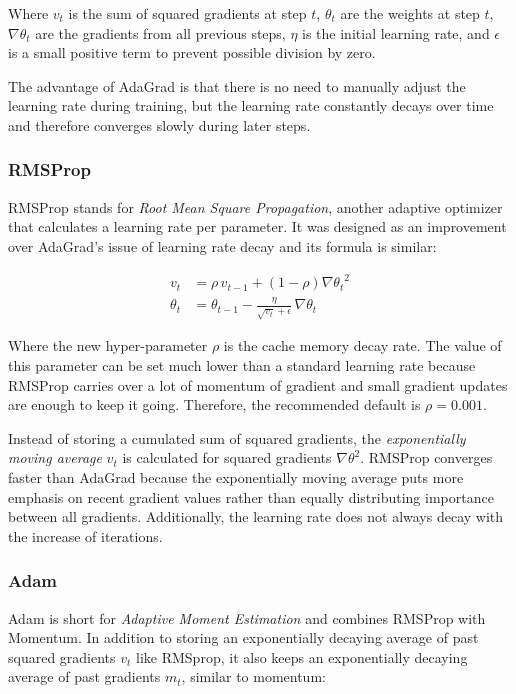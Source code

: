 \documentclass[a4paper]{article}
\begin{document}
Where $v_t$ is the sum of squared gradients at step $t$, $\theta_t$ are the weights at step $t$, $\nabla\theta_t$ are the gradients from all previous steps, $\eta$ is the initial learning rate, and $\epsilon$ is a small positive term to prevent possible division by zero.

The advantage of AdaGrad is that there is no need to manually adjust the learning rate during training, but the learning rate constantly decays over time and therefore converges slowly during later steps.

\subsubsection*{RMSProp}
RMSProp stands for \emph{Root Mean Square Propagation}, another adaptive optimizer that calculates a learning rate per parameter. It was designed as an improvement over AdaGrad's issue of learning rate decay and its formula is similar:

\begin{align*}
    v_t &= \rho \, v_{t-1} + (1-\rho) {\nabla\theta_t}^2 \\
    \theta_t &= \theta_{t-1} - \frac{\eta}{\sqrt{v_t} + \epsilon} \, \nabla\theta_t
\end{align*}

Where the new hyper-parameter $\rho$ is the cache memory decay rate. The value of this parameter can be set much lower than a standard learning rate because RMSProp carries over a lot of momentum of gradient and small gradient updates are enough to keep it going. Therefore, the recommended default is $\rho = 0.001$.


Instead of storing a cumulated sum of squared gradients, the \emph{exponentially moving average} $v_t$ is calculated for squared gradients ${\nabla\theta}^2$. RMSProp converges faster than AdaGrad because the exponentially moving average puts more emphasis on recent gradient values rather than equally distributing importance between all gradients. Additionally, the learning rate does not always decay with the increase of iterations. 

\subsubsection*{Adam}
Adam is short for \emph{Adaptive Moment Estimation} and combines RMSProp with Momentum. In addition to storing an exponentially decaying average of past squared gradients $v_t$ like RMSprop, it also keeps an exponentially decaying average of past gradients $m_t$, similar to momentum:
\end{document}

